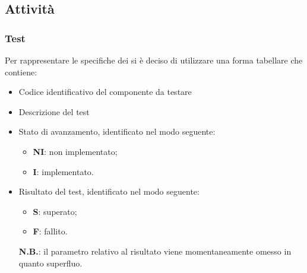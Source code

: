 \documentclass[]{article}
\begin{document}
		\subsection{Attività}
		\subsubsection{Test}
		Per rappresentare le specifiche dei  si è deciso di utilizzare una forma tabellare che contiene:
				\begin{itemize}
					\item Codice identificativo del componente da testare
					\item Descrizione del test
					\item Stato di avanzamento, identificato nel modo seguente:
						\begin{itemize}
							\item \textbf{NI}: non implementato;
							\item \textbf{I}: implementato.						
						\end{itemize}		
					\item Risultato del test, identificato nel modo seguente:
						\begin{itemize}
							\item \textbf{S}: superato;
							\item \textbf{F}: fallito.
						\end{itemize}
						\textbf{N.B.}: il parametro relativo al risultato viene momentaneamente omesso in quanto superfluo.						 
				\end{itemize}		
		
\end{document}

